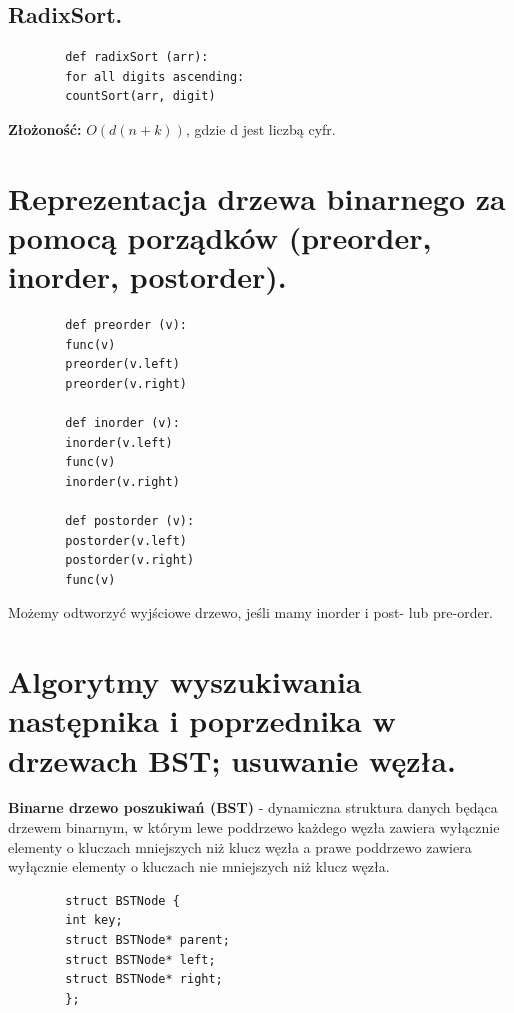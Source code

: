 \documentclass[12pt]{article}
\begin{document}
    \subsection{RadixSort.}
    \begin{verbatim}
        def radixSort (arr):
        for all digits ascending:
        countSort(arr, digit)
    \end{verbatim}
    \textbf{Złożoność:} $O(d(n+k))$, gdzie d jest liczbą cyfr.

    \newpage

    \section{Reprezentacja drzewa binarnego za pomocą porządków (preorder, inorder, postorder).}


    \begin{verbatim}
        def preorder (v):
        func(v)
        preorder(v.left)
        preorder(v.right)

        def inorder (v):
        inorder(v.left)
        func(v)
        inorder(v.right)

        def postorder (v):
        postorder(v.left)
        postorder(v.right)
        func(v)
    \end{verbatim}

    Możemy odtworzyć wyjściowe drzewo, jeśli mamy inorder i post- lub pre-order.

    \newpage

    \section{Algorytmy wyszukiwania następnika i poprzednika w drzewach BST; usuwanie węzła.}

    \begin{definition}
        \textbf{Binarne drzewo poszukiwań (BST)} - dynamiczna struktura danych będąca drzewem binarnym, w którym lewe
        poddrzewo każdego węzła zawiera wyłącznie elementy o kluczach mniejszych niż klucz węzła a prawe poddrzewo
        zawiera wyłącznie elementy o kluczach nie mniejszych niż klucz węzła.
    \end{definition}

    \begin{verbatim}
        struct BSTNode {
        int key;
        struct BSTNode* parent;
        struct BSTNode* left;
        struct BSTNode* right;
        };
    \end{verbatim}
\end{document}
